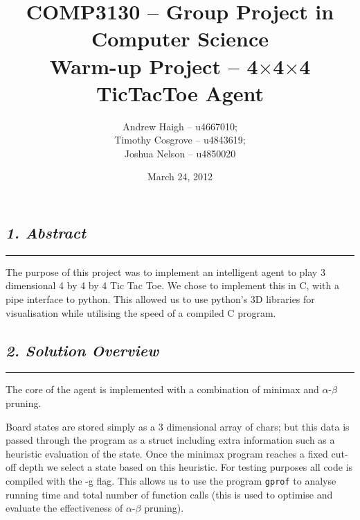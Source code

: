 \documentclass[10pt,twocolumn]{article}
\title{COMP3130 -- Group Project in Computer Science\\ Warm-up Project -- 4$\times$4$\times$4 TicTacToe Agent}
\date{March 24, 2012}
\author{Andrew Haigh -- u4667010;\\ Timothy Cosgrove -- u4843619;\\ Joshua Nelson -- u4850020}
\begin{document}
\onecolumn
\maketitle
\twocolumn
\subsection*{\emph { \textmd{1. Abstract}}}
\hrule
\vspace{0.4cm}
The purpose of this project was to implement an intelligent agent to play 3
dimensional 4 by 4 by 4 Tic Tac Toe. We chose to implement this in C, with a
pipe interface to python. This allowed us to use python's 3D libraries for visualisation
while utilising the speed of a compiled C program.

\subsection*{\emph { \textmd{2. Solution Overview}}}
\hrule
\vspace{0.4cm}
The core of the agent is implemented with a combination of minimax and $\alpha$-$\beta$ pruning.

Board states are stored simply as a 3 dimensional array of chars; but this data is passed
through the program as a struct including extra information such as a heuristic evaluation
of the state. Once the minimax program reaches a fixed cut-off depth we select a state based on
this heuristic. For testing purposes all code is compiled with the -g flag. This allows
us to use the program \texttt{gprof} to analyse running time and total number of function calls
(this is used to optimise and evaluate the effectiveness of $\alpha$-$\beta$ pruning).
\end{document}

